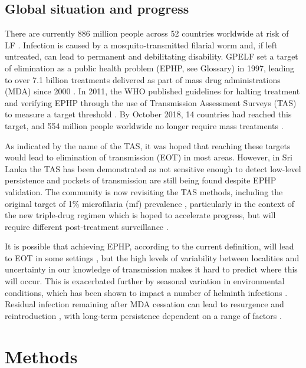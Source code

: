 \subsection[Global situation]{Global situation and progress}

There are currently 886 million people across 52 countries worldwide at risk of LF \cite{WHO2019_FactSheet}. Infection is caused by a mosquito-transmitted filarial worm and, if left untreated, can lead to permanent and debilitating disability. GPELF set a target of elimination as a public health problem (EPHP, see Glossary) in 1997, leading to over 7.1 billion treatments delivered as part of mass drug administrations (MDA) since 2000 \cite{WHO2017_GPELF}. In 2011, the WHO published guidelines for halting treatment and verifying EPHP through the use of Transmission Assessment Surveys (TAS) to measure a target threshold \cite{WHO2017_Validation,WHO2017_Alternatives}. By October 2018, 14 countries had reached this target, and 554 million people worldwide no longer require mass treatments \cite{WHO2019_FactSheet}.

As indicated by the name of the TAS, it was hoped that reaching these targets would lead to elimination of transmission (EOT) in most areas. However, in Sri Lanka the TAS has been demonstrated as not sensitive enough to detect low-level persistence \cite{rao2014,rebollo2015} and pockets of transmission are still being found despite EPHP validation. The community is now revisiting the TAS methods, including the original target of 1\% microfilaria (mf) prevalence \cite{WHO2016}, particularly in the context of the new triple-drug regimen which is hoped to accelerate progress, but will require different post-treatment surveillance \cite{Irvine2017_Tripledrug}.

It is possible that achieving EPHP, according to the current definition, will lead to EOT in some settings \cite{DeJian2013,Won2018}, but the high levels of variability between localities and uncertainty in our knowledge of transmission makes it hard to predict where this will occur. This is exacerbated further by seasonal variation in environmental conditions, which has been shown to impact a number of helminth infections \cite{Davis2018,White2011}. Residual infection remaining after MDA cessation can lead to resurgence and reintroduction \cite{Xu2019,Singh2015}, with long-term persistence dependent on a range of factors \cite{Minetti2019}.

\section{Methods}

